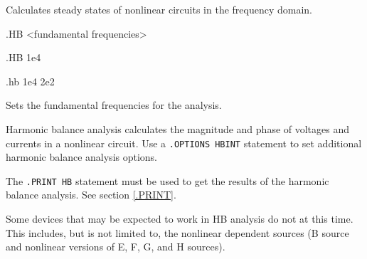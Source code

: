 


 
Calculates steady states of nonlinear circuits in the frequency domain.

\begin{Command}

\format
.HB <fundamental frequencies>

\examples
.HB 1e4

.hb 1e4 2e2
\arguments

\begin{Arguments}
Sets the fundamental frequencies for the analysis.

\end{Arguments}

\comments

Harmonic balance analysis calculates the magnitude and phase of voltages
and currents in a nonlinear circuit. Use a \texttt{.OPTIONS HBINT}
statement to set additional harmonic balance analysis options.

The \texttt{.PRINT HB}
statement must be used to get the results of the harmonic balance analysis. 
See section \ref{.PRINT}.

Some devices that may be expected to work in HB analysis do not at
this time.  This includes, but is not limited to, the nonlinear
dependent sources (B source and nonlinear versions of E, F, G, and H
sources).

\end{Command}
